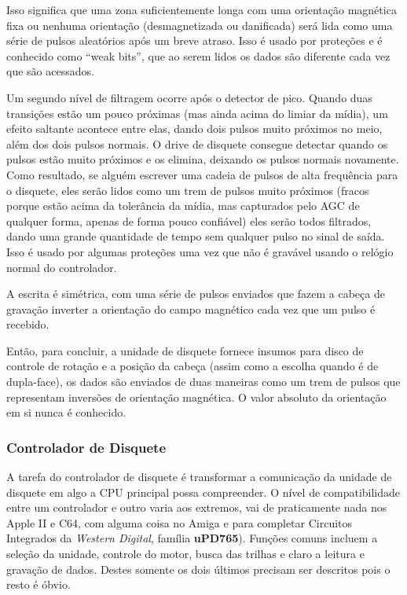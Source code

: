 \documentclass[letterpaper,10pt,brazil]{sphinxmanual}
\begin{document}
Isso significa que uma zona suficientemente longa com uma orientação
magnética fixa ou nenhuma orientação (desmagnetizada ou danificada) será
lida como uma série de pulsos aleatórios após um breve atraso. Isso é
usado por proteções e é conhecido como ``weak bits'', que ao serem lidos
os dados são diferente cada vez que são acessados.

Um segundo nível de filtragem ocorre após o detector de pico. Quando
duas transições estão um pouco próximas (mas ainda acima do limiar da
mídia), um efeito saltante acontece entre elas, dando dois pulsos muito
próximos no meio, além dos dois pulsos normais. O drive de disquete
consegue detectar quando os pulsos estão muito próximos e os elimina,
deixando os pulsos normais novamente. Como resultado, se alguém escrever
uma cadeia de pulsos de alta frequência para o disquete, eles serão
lidos como um trem de pulsos muito próximos (fracos porque estão acima
da tolerância da mídia, mas capturados pelo AGC de qualquer forma,
apenas de forma pouco confiável) eles serão todos filtrados, dando uma
grande quantidade de tempo sem qualquer pulso no sinal de saída. Isso é
usado por algumas proteções uma vez que não é gravável usando o relógio
normal do controlador.

A escrita é simétrica, com uma série de pulsos enviados que fazem a
cabeça de gravação inverter a orientação do campo magnético cada vez que
um pulso é recebido.

Então, para concluir, a unidade de disquete fornece insumos para disco
de controle de rotação e a posição da cabeça (assim como a escolha
quando é de dupla-face), os dados são enviados de duas maneiras como um
trem de pulsos que representam inversões de orientação magnética.
O valor absoluto da orientação em si nunca é conhecido.


\subsubsection{Controlador de Disquete}
\label{techspecs/floppy:controlador-de-disquete}
A tarefa do controlador de disquete é transformar a comunicação da
unidade de disquete em algo a CPU principal possa compreender.
O nível de compatibilidade entre um controlador e outro varia aos
extremos, vai de praticamente nada nos Apple II e C64, com alguma coisa
no Amiga e para completar Circuitos Integrados da \emph{Western Digital},
família \textbf{uPD765}).
Funções comuns incluem a seleção da unidade, controle do motor, busca
das trilhas e claro a leitura e gravação de dados. Destes somente os
dois últimos precisam ser descritos pois o resto é óbvio.
\end{document}
